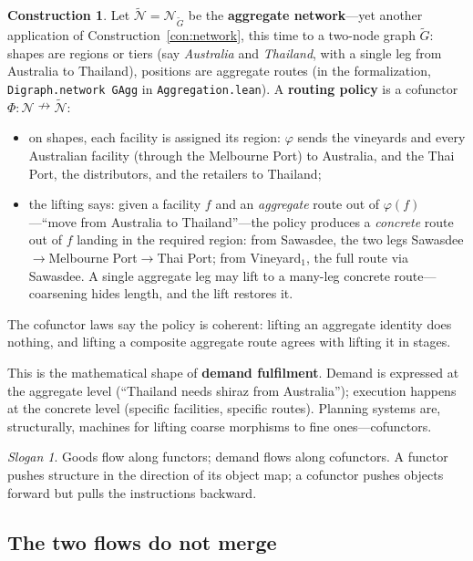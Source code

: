 \documentclass[11pt,a4paper]{article}
\newcommand{\N}{\mathcal{N}}
\theoremstyle{plain}
\theoremstyle{definition}
\newtheorem{construction}[theorem]{Construction}
\theoremstyle{remark}
\newtheorem{slogan}[theorem]{Slogan}
\begin{document}
\begin{construction}\label{con:aggregation}
Let $\widetilde{\N} = \N_{\widetilde{G}}$ be the \textbf{aggregate network}---yet another
application of Construction~\ref{con:network}, this time to a two-node
graph $\widetilde{G}$: shapes are
regions or tiers (say \emph{Australia} and \emph{Thailand}, with a
single leg from Australia to Thailand),
positions are aggregate routes
(in the formalization, \texttt{Digraph.network GAgg} in
\texttt{Aggregation.lean}). A \textbf{routing policy} is a
cofunctor $\Phi : \N \nrightarrow \widetilde{\N}$:
\begin{itemize}[nosep]
\item on shapes, each facility is assigned its region: $\varphi$
  sends the vineyards and every Australian facility (through
  the Melbourne Port) to Australia, and the Thai Port, the
  distributors, and the retailers to Thailand;
\item the lifting says: given a facility $f$ and an \emph{aggregate}
  route out of $\varphi(f)$---``move from Australia to
  Thailand''---the policy produces a \emph{concrete} route out
  of $f$ landing in the required region: from Sawasdee, the two legs
  Sawasdee${}\to{}$Melbourne Port${}\to{}$Thai Port; from
  Vineyard$_1$, the full route via Sawasdee. A single aggregate leg
  may lift to a many-leg concrete route---coarsening hides length,
  and the lift restores it.
\end{itemize}
The cofunctor laws say the policy is coherent: lifting an aggregate
identity does nothing, and lifting a composite aggregate route agrees
with lifting it in stages.
\end{construction}

This is the mathematical shape of \textbf{demand fulfilment}. Demand
is expressed at the aggregate level (``Thailand needs shiraz from
Australia''); execution happens at the concrete level (specific facilities,
specific routes). Planning systems are, structurally, machines for
lifting coarse morphisms to fine ones---cofunctors.

\begin{slogan}
Goods flow along functors; demand flows along cofunctors. A functor
pushes structure in the direction of its object map; a cofunctor pushes
objects forward but pulls the instructions backward.
\end{slogan}

\subsection{The two flows do not merge}
\end{document}
